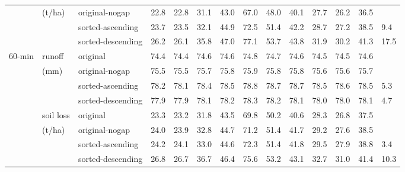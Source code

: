 \begin{table}
\begin{tabular}{llllllllllllll}
 & (t/ha) & original-nogap &  22.8 &  22.8 &  31.1 &  43.0 &  67.0 &  48.0 &
40.1 &  27.7 &  26.2 &  36.5 & \\
 &  & sorted-ascending & 23.7 & 23.5 & 32.1 & 44.9 & 72.5 & 51.4 & 42.2 & 28.7 &
27.2 & 38.5 & 9.4 \\
 &  & sorted-descending & 26.2 &  26.1 &  35.8 &  47.0 &  77.1 &  53.7 &  43.8 &
31.9 &  30.2 &  41.3 &  17.5\\
\midrule
60-min & runoff  & original & 74.4 & 74.4 & 74.6 & 74.6 & 74.8 & 74.7 & 74.6 &
74.5 & 74.5 & 74.6 &  \\
 & (mm) & original-nogap &  75.5 &  75.5 &  75.7 &  75.8 &  75.9 &  75.8 &  75.8
& 75.6 &  75.6 &  75.7 & \\
 &  & sorted-ascending & 78.2 & 78.1 & 78.4 & 78.5 & 78.8 & 78.7 & 78.7 & 78.5 &
78.6 & 78.5 & 5.3 \\
 &  & sorted-descending & 77.9 &  77.9 &  78.1 &  78.2 &  78.3 &  78.2 &  78.1 &
78.0 &  78.0 &  78.1 &  4.7\\
 & soil loss  & original & 23.3 & 23.2 & 31.8 & 43.5 & 69.8 & 50.2 & 40.6 & 28.3
& 26.8 & 37.5 &  \\
 & (t/ha) & original-nogap &  24.0 &  23.9 &  32.8 &  44.7 &  71.2 &  51.4 &
41.7 &  29.2 &  27.6 &  38.5 & \\
 &  & sorted-ascending & 24.2 & 24.1 & 33.0 & 44.6 & 72.3 & 51.4 & 41.8 & 29.5 &
27.9 & 38.8 & 3.4 \\
 &  & sorted-descending & 26.8 &  26.7 &  36.7 &  46.4 &  75.6 &  53.2 &  43.1 &
32.7 &  31.0 &  41.4 &  10.3\\
\bottomrule
    \end{tabular}
\end{table}

